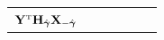 \documentclass[
]{book}
\begin{document}
\begin{longtable}[]{@{}cccccc@{}}
\begin{minipage}[t]{0.14\columnwidth}
\strut
\end{minipage} & \begin{minipage}[t]{0.14\columnwidth}\centering
\strut
\end{minipage}\tabularnewline
\begin{minipage}[t]{0.14\columnwidth}\centering
\({\bf Y}^{{ \mathrm{\scriptscriptstyle T} }}{\bf H}_{\hat{{\boldsymbol \gamma}}}{\bf X}_{-\hat{\boldsymbol \gamma}}\)\strut
\end{minipage} & \begin{minipage}[t]{0.14\columnwidth}\centering
\strut
\end{minipage} & \begin{minipage}[t]{0.14\columnwidth}\centering
\strut
\end{minipage} & \begin{minipage}[t]{0.14\columnwidth}\centering
\strut
\end{minipage} & \begin{minipage}[t]{0.14\columnwidth}\centering
\strut
\end{minipage} & \begin{minipage}[t]{0.14\columnwidth}\centering
\strut
\end{minipage}\tabularnewline
\bottomrule
\end{longtable}
\end{document}
